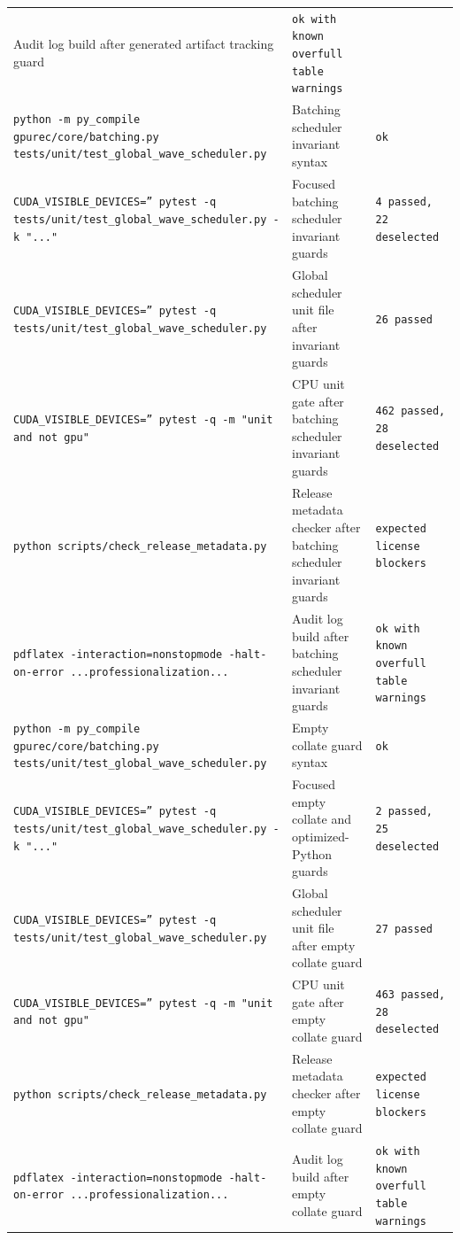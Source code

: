 \documentclass[11pt]{article}
\begin{document}
\begin{center}
\begin{tabular}{lll}
Audit log build after generated artifact tracking guard &
\texttt{ok with known overfull table warnings} \\
\texttt{python -m py\_compile gpurec/core/batching.py tests/unit/test\_global\_wave\_scheduler.py} &
Batching scheduler invariant syntax &
\texttt{ok} \\
\texttt{CUDA\_VISIBLE\_DEVICES='' pytest -q tests/unit/test\_global\_wave\_scheduler.py -k "..."} &
Focused batching scheduler invariant guards &
\texttt{4 passed, 22 deselected} \\
\texttt{CUDA\_VISIBLE\_DEVICES='' pytest -q tests/unit/test\_global\_wave\_scheduler.py} &
Global scheduler unit file after invariant guards &
\texttt{26 passed} \\
\texttt{CUDA\_VISIBLE\_DEVICES='' pytest -q -m "unit and not gpu"} &
CPU unit gate after batching scheduler invariant guards &
\texttt{462 passed, 28 deselected} \\
\texttt{python scripts/check\_release\_metadata.py} &
Release metadata checker after batching scheduler invariant guards &
\texttt{expected license blockers} \\
\texttt{pdflatex -interaction=nonstopmode -halt-on-error ...professionalization...} &
Audit log build after batching scheduler invariant guards &
\texttt{ok with known overfull table warnings} \\
\texttt{python -m py\_compile gpurec/core/batching.py tests/unit/test\_global\_wave\_scheduler.py} &
Empty collate guard syntax &
\texttt{ok} \\
\texttt{CUDA\_VISIBLE\_DEVICES='' pytest -q tests/unit/test\_global\_wave\_scheduler.py -k "..."} &
Focused empty collate and optimized-Python guards &
\texttt{2 passed, 25 deselected} \\
\texttt{CUDA\_VISIBLE\_DEVICES='' pytest -q tests/unit/test\_global\_wave\_scheduler.py} &
Global scheduler unit file after empty collate guard &
\texttt{27 passed} \\
\texttt{CUDA\_VISIBLE\_DEVICES='' pytest -q -m "unit and not gpu"} &
CPU unit gate after empty collate guard &
\texttt{463 passed, 28 deselected} \\
\texttt{python scripts/check\_release\_metadata.py} &
Release metadata checker after empty collate guard &
\texttt{expected license blockers} \\
\texttt{pdflatex -interaction=nonstopmode -halt-on-error ...professionalization...} &
Audit log build after empty collate guard &
\texttt{ok with known overfull table warnings} \\

\end{tabular}
\end{center}
\end{document}
